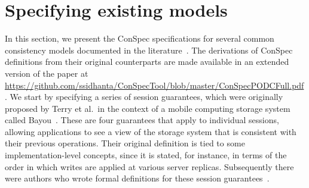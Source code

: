 \documentclass[acmlarge, ,11pt]{acmart}
\begin{document}
 \section{Specifying existing models}\label{sec:list}
In this section, we present the ConSpec specifications for several common consistency models  documented in the literature~\cite{Chockler2000, Terry:1994:SGW:645792.668302, Burckhardt:2014:PEC:2693641.2693642}. The derivations of  ConSpec definitions from their original counterparts are made available in an extended version of the paper  at \url{https://github.com/ssidhanta/ConSpecTool/blob/master/ConSpecPODCFull.pdf}. %
We start by specifying a series of session guarantees, which were originally proposed by Terry et al.\ in the context of a mobile computing storage system called Bayou~\cite{Terry:1994:SGW:645792.668302}. These are four guarantees that apply to individual sessions, allowing applications to see a view of the storage system that is consistent with their previous operations. Their original definition is tied to some implementation-level concepts, since it is stated, for instance, in terms of the order in which writes are applied at various server replicas. Subsequently there were authors who wrote formal definitions for these session guarantees~\cite{Chockler2000, Burckhardt:2014:PEC:2693641.2693642}.
\end{document}
